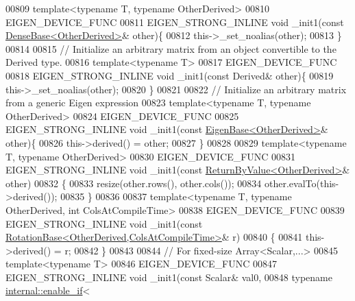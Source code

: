 \begin{DoxyCode}
00809     \textcolor{keyword}{template}<\textcolor{keyword}{typename} T, \textcolor{keyword}{typename} OtherDerived>
00810     EIGEN\_DEVICE\_FUNC
00811     EIGEN\_STRONG\_INLINE \textcolor{keywordtype}{void} \_init1(\textcolor{keyword}{const} \hyperlink{group___core___module_class_eigen_1_1_dense_base}{DenseBase<OtherDerived>}& other)\{
00812       this->\_set\_noalias(other);
00813     \}
00814 
00815     \textcolor{comment}{// Initialize an arbitrary matrix from an object convertible to the Derived type.}
00816     \textcolor{keyword}{template}<\textcolor{keyword}{typename} T>
00817     EIGEN\_DEVICE\_FUNC
00818     EIGEN\_STRONG\_INLINE \textcolor{keywordtype}{void} \_init1(\textcolor{keyword}{const} Derived& other)\{
00819       this->\_set\_noalias(other);
00820     \}
00821 
00822     \textcolor{comment}{// Initialize an arbitrary matrix from a generic Eigen expression}
00823     \textcolor{keyword}{template}<\textcolor{keyword}{typename} T, \textcolor{keyword}{typename} OtherDerived>
00824     EIGEN\_DEVICE\_FUNC
00825     EIGEN\_STRONG\_INLINE \textcolor{keywordtype}{void} \_init1(\textcolor{keyword}{const} \hyperlink{group___core___module_struct_eigen_1_1_eigen_base}{EigenBase<OtherDerived>}& other)\{
00826       this->derived() = other;
00827     \}
00828 
00829     \textcolor{keyword}{template}<\textcolor{keyword}{typename} T, \textcolor{keyword}{typename} OtherDerived>
00830     EIGEN\_DEVICE\_FUNC
00831     EIGEN\_STRONG\_INLINE \textcolor{keywordtype}{void} \_init1(\textcolor{keyword}{const} \hyperlink{group___core___module_class_eigen_1_1_return_by_value}{ReturnByValue<OtherDerived>}& other)
00832     \{
00833       resize(other.rows(), other.cols());
00834       other.evalTo(this->derived());
00835     \}
00836 
00837     \textcolor{keyword}{template}<\textcolor{keyword}{typename} T, \textcolor{keyword}{typename} OtherDerived, \textcolor{keywordtype}{int} ColsAtCompileTime>
00838     EIGEN\_DEVICE\_FUNC
00839     EIGEN\_STRONG\_INLINE \textcolor{keywordtype}{void} \_init1(\textcolor{keyword}{const} 
      \hyperlink{class_eigen_1_1_rotation_base}{RotationBase<OtherDerived,ColsAtCompileTime>}& r)
00840     \{
00841       this->derived() = r;
00842     \}
00843     
00844     \textcolor{comment}{// For fixed-size Array<Scalar,...>}
00845     \textcolor{keyword}{template}<\textcolor{keyword}{typename} T>
00846     EIGEN\_DEVICE\_FUNC
00847     EIGEN\_STRONG\_INLINE \textcolor{keywordtype}{void} \_init1(\textcolor{keyword}{const} Scalar& val0,
00848                                     \textcolor{keyword}{typename} \hyperlink{struct_eigen_1_1internal_1_1enable__if}{internal::enable\_if}<    

\end{DoxyCode}
